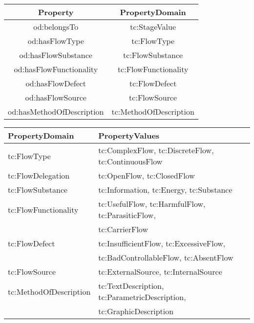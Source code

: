 \documentclass[a4paper,11pt]{article}
\begin{document}
    \begin{center}
    \begin{tabular}{|c|c|}\hline
        Property & PropertyDomain \\\hline
        od:belongsTo & tc:StageValue \\
        od:hasFlowType & tc:FlowType  \\
        od:hasFlowSubstance & tc:FlowSubstance  \\
        od:hasFlowFunctionality & tc:FlowFunctionality  \\
        od:hasFlowDefect & tc:FlowDefect  \\
        od:hasFlowSource & tc:FlowSource  \\
        od:hasMethodOfDescription & tc:MethodOfDescription \\\hline 
    \end{tabular}
    \end{center}

    \begin{center}
    \begin{tabular}{|l|p{10cm}|}\hline
        PropertyDomain & PropertyValues \\\hline
        tc:FlowType & tc:ComplexFlow, tc:DiscreteFlow, tc:ContinuousFlow \\
        tc:FlowDelegation & tc:OpenFlow, tc:ClosedFlow \\
        tc:FlowSubstance & tc:Information, tc:Energy, tc:Substance \\
        tc:FlowFunctionality & tc:UsefulFlow, tc:HarmfulFlow, tc:ParasiticFlow, \\
        & tc:CarrierFlow \\
        tc:FlowDefect & tc:InsufficientFlow, tc:ExcessiveFlow, \\
        & tc:BadControllableFlow, tc:AbsentFlow \\ 
        tc:FlowSource & tc:ExternalSource, tc:InternalSource  \\
        tc:MethodOfDescription & tc:TextDescription, tc:ParametricDescription, \\
        & tc:GraphicDescription \\\hline 
    \end{tabular}
    \end{center}
\end{document}
